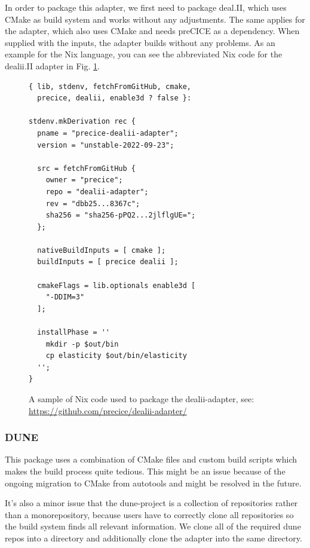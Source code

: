 \documentclass[conference,final,a4paper]{IEEEtran}
\begin{document}
In order to package this adapter, we first need to package deal.II, which uses CMake as build system and works without any adjustments.
The same applies for the adapter, which also uses CMake and needs preCICE as a dependency.
When supplied with the inputs, the adapter builds without any problems.
As an example for the Nix language, you can see the abbreviated Nix code for the dealii.II adapter in Fig. \ref{lst:dealii-adapter-nix}.\\

\begin{figure}
    \begin{multicols}{2}
    \normalsize
    \begin{verbatim}
{ lib, stdenv, fetchFromGitHub, cmake,
  precice, dealii, enable3d ? false }:

stdenv.mkDerivation rec {
  pname = "precice-dealii-adapter";
  version = "unstable-2022-09-23";

  src = fetchFromGitHub {
    owner = "precice";
    repo = "dealii-adapter";
    rev = "dbb25...8367c";
    sha256 = "sha256-pPQ2...2jlflgUE=";
  };

  nativeBuildInputs = [ cmake ];
  buildInputs = [ precice dealii ];

  cmakeFlags = lib.optionals enable3d [
    "-DDIM=3"
  ];

  installPhase = ''
    mkdir -p $out/bin
    cp elasticity $out/bin/elasticity
  '';
}
    \end{verbatim}
    \end{multicols}
    \caption{A sample of Nix code used to package the dealii-adapter, see: \url{https://github.com/precice/dealii-adapter/}}
    \label{lst:dealii-adapter-nix}
    \hrulefill
    \vspace*{4pt}
\end{figure}

\subsubsection{DUNE}

This package uses a combination of CMake files and custom build scripts which makes the build process quite tedious.
This might be an issue because of the ongoing migration to CMake from autotools and might be resolved in the future.

It's also a minor issue that the dune-project is a collection of repositories rather than a monorepository, because users have to correctly clone all repositories so the build system finds all relevant information.
We clone all of the required dune repos into a directory and additionally clone the adapter into the same directory.
\end{document}
